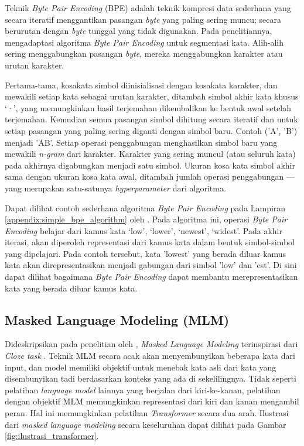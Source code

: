     Teknik \textit{Byte Pair Encoding} (BPE) \parencite{GageBPE1994} adalah teknik kompresi data sederhana yang secara iteratif menggantikan pasangan \textit{byte} yang paling sering muncu; secara berurutan dengan \textit{byte} tunggal yang tidak digunakan. Pada penelitiannya, \parencite{Sennrich_Haddow_Birch_2016} mengadaptasi algoritma \textit{Byte Pair Encoding} untuk segmentasi kata. Alih-alih sering menggabungkan pasangan \textit{byte}, mereka menggabungkan karakter atau urutan karakter.

    Pertama-tama, kosakata simbol diinisialisasi dengan kosakata karakter, dan mewakili setiap kata sebagai urutan karakter, ditambah simbol akhir kata khusus ‘·’, yang memungkinkan hasil terjemahan dikembalikan ke bentuk awal setelah terjemahan. Kemudian semua pasangan simbol dihitung secara iteratif dan untuk setiap pasangan yang paling sering diganti dengan simbol baru. Contoh ('A', 'B') menjadi 'AB'. Setiap operasi penggabungan menghasilkan simbol baru yang mewakili \textit{n-gram} dari karakter. Karakter yang sering muncul (atau seluruh kata) pada akhirnya digabungkan menjadi satu simbol. Ukuran kosa kata simbol akhir sama dengan ukuran kosa kata awal, ditambah jumlah operasi penggabungan --- yang merupakan satu-satunya \textit{hyperparameter} dari algoritma.

    Dapat dilihat contoh sederhana algoritma \textit{Byte Pair Encoding} pada Lampiran \ref{appendix:simple_bpe_algorithm} oleh \parencite{Sennrich_Haddow_Birch_2016}. Pada algoritma ini, operasi \textit{Byte Pair Encoding} belajar dari kamus kata {‘low’, ‘lower’, ‘newest’, ‘widest’}. Pada akhir iterasi, akan diperoleh representasi dari kamus kata dalam bentuk simbol-simbol yang dipelajari. Pada contoh tersebut, kata 'lowest' yang berada diluar kamus kata akan direpresentasikan menjadi gabungan dari simbol 'low' dan 'est'. Di sini dapat dilihat bagaimana \textit{Byte Pair Encoding} dapat membantu merepresentasikan kata yang berada diluar kamus kata. 

    \subsection{Masked Language Modeling (MLM)}
    Dideskripsikan pada penelitian oleh \parencite{Devlin_Chang_Lee_Toutanova_2019}, \textit{Masked Language Modeling} terinspirasi dari \textit{Cloze task} \parencite{Taylor_1953}. Teknik MLM secara acak akan menyembunyikan beberapa kata dari input, dan model memiliki objektif untuk menebak kata asli dari kata yang disembunyikan tadi berdasarkan konteks yang ada di sekelilingnya. Tidak seperti pelatihan \textit{language model} lainnya yang berjalan dari kiri-ke-kanan, pelatihan dengan objektif MLM memungkinkan representasi dari kiri dan kanan mengambil peran. Hal ini memungkinkan pelatihan \textit{Transformer} secara dua arah. Ilustrasi dari \textit{masked language modeling} secara keseluruhan dapat dilihat pada Gambar \ref{fig:ilustrasi_transformer}.

